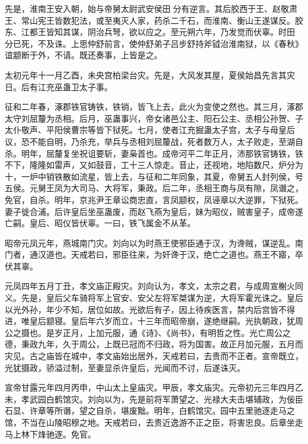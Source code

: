\documentclass[12pt,UTF8]{ctexbook}
\begin{document}
先是，淮南王安入朝，始与帝舅太尉武安侯田分有逆言。其后胶西于王、赵敬肃王、常山宪王皆数犯法，或至夷灭人家，药杀二千石，而淮南、衡山王遂谋反。胶东、江都王皆知其谋，阴治兵弩，欲以应之。至元朔六年，乃发觉而伏辜。时田分已死，不及诛。上思仲舒前言，使仲舒弟子吕步舒持斧钺治淮南狱，以《春秋》谊颛断于外，不请。既还奏事，上皆是之。



太初元年十一月乙酉，未央宫柏梁台灾。先是，大风发其屋，夏侯始昌先言其灾日。后有江充巫蛊卫太子事。



征和二年春，涿郡铁官铸铁，铁销，皆飞上去，此火为变使之然也。其三月，涿郡太守刘屈釐为丞相。后月，巫蛊事兴，帝女诸邑公主、阳石公主、丞相公孙贺、子太仆敬声、平阳侯曹宗等皆下狱死。七月，使者江充掘蛊太子宫，太子与母皇后议，恐不能自明，乃杀充，举兵与丞相刘屈釐战，死者数万人，太子败走，至湖自杀。明年，屈釐复坐祝诅要斩，妻枭首也。成帝河平二年正月，沛那铁官铸铁，铁不下，隆隆如雷声，又如鼓音，工十三人惊走。音止，还视地，地陷数尺，炉分为十，一炉中销铁散如流星，皆上去，与征和二年同象，其夏，帝舅五人封列侯，号五侯。元舅王凤为大司马、大将军，秉政。后二年，丞相王商与凤有隙，凤谮之，免官，自杀。明年，京兆尹王章讼商忠直，言凤颛权，凤诬章以大逆罪，下狱死。妻子徙合浦。后许皇后坐巫蛊废，而赵飞燕为皇后，妹为昭仪，贼害皇子，成帝遂亡嗣。皇后、昭仪皆伏辜。一曰，铁飞属金不从革。



昭帝元凤元年，燕城南门灾。刘向以为时燕王使邪臣通于汉，为谗贼，谋逆乱。南门者，通汉道也。天戒若曰，邪臣往来，为奸谗于汉，绝亡之道也。燕王不寤，卒伏其辜。



元凤四年五月丁丑，孝文庙正殿灾。刘向认为，孝文，太宗之君，与成周宣榭火同义。先是，皇后父车骑将军上官安、安父左将军桀谋为逆，大将军霍光诛之。皇后以光外孙，年少不知，居位如故。光欲后有子，因上待疾医言，禁内后宫皆不得进，唯皇后颛寝。皇后年六岁而立，十三年而昭帝崩，遂绝继嗣。光执朝政，犹周公之摄也。是岁正月，上加元服，通《诗》、《尚书》，有明哲之性。光亡周公之德，秉政九年，久于周公，上既已冠而不归政，将为国害。故正月加元服，五月而灾见。古之庙皆在城中，孝文庙始出居外，天戒若曰，去贵而不正者。宣帝既立，光犹摄政，骄溢过制，至妻显杀许皇后，光闻而不讨，后遂诛灭。



宣帝甘露元年四月丙申，中山太上皇庙灾。甲辰，孝文庙灾。元帝初元三年四月乙未，孝武园白鹤馆灾。刘向以为，先是前将军萧望之、光禄大夫击堪辅政，为佞臣石显、许章等所谮，望之自杀，堪废黜。明年，白鹤馆灾。园中五里驰逐走马之馆，不当在山陵昭穆之地。天戒若曰，去贵近逸游不正之臣，将害忠良。后章坐走马上林下烽驰逐。免官。
\end{document}
